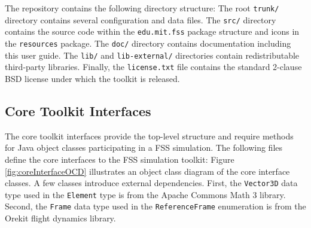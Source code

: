 \documentclass[]{article}
\begin{document}
The repository contains the following directory structure:
The root \texttt{trunk/} directory contains several configuration and data files. The \texttt{src/} directory contains the source code within the \texttt{edu.mit.fss} package structure and icons in the \texttt{resources} package. The \texttt{doc/} directory contains documentation including this user guide. The \texttt{lib/} and \texttt{lib-external/} directories contain redistributable third-party libraries. Finally, the \texttt{license.txt} file contains the standard 2-clause BSD license under which the toolkit is released.

\subsection{Core Toolkit Interfaces}

The core toolkit interfaces provide the top-level structure and require methods for Java object classes participating in a FSS simulation. The following files define the core interfaces to the FSS simulation toolkit:
Figure \ref{fig:coreInterfaceOCD} illustrates an object class diagram of the core interface classes. A few classes introduce external dependencies. First, the \texttt{Vector3D} data type used in the \texttt{Element} type is from the Apache Commons Math 3 library. Second, the \texttt{Frame} data type used in the \texttt{ReferenceFrame} enumeration is from the Orekit flight dynamics library.
\end{document}
